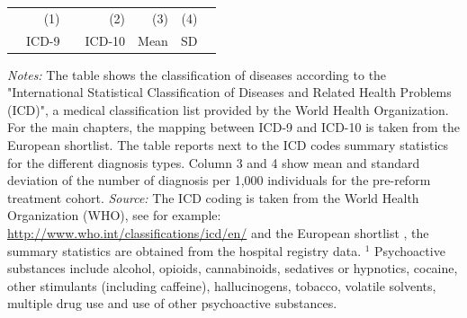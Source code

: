 \documentclass[11pt, a4paper]{article} %
\begin{document}
\begin{landscape}
\begin{table}[h]
\begin{threeparttable}
			\begin{tabular}{lrrrrrr} %
				\toprule %
				&\multicolumn{1}{r}{(1)}& &\multicolumn{1}{r}{(2)}&\multicolumn{1}{r}{(3)} &\multicolumn{1}{r}{(4)}\\
				&\multicolumn{1}{r}{ICD-9} & & \multicolumn{1}{r}{ICD-10}&\multicolumn{1}{r}{Mean}&\multicolumn{1}{r}{SD} \\ 
				\midrule
				
				\bottomrule %
			\end{tabular}
			\begin{tablenotes}
				\scriptsize{ \item \textit{Notes:} The table shows the classification of diseases according to the "International Statistical Classification of Diseases and Related Health Problems (ICD)", a medical classification list provided by the World Health Organization. For the main chapters, the mapping between ICD-9 and ICD-10 is taken from the European shortlist. The table reports next to the ICD codes summary statistics for the different diagnosis types. Column 3 and 4 show mean and standard deviation of the number of diagnosis per 1,000 individuals for the pre-reform treatment cohort. \newline \textit{Source:} The ICD coding is taken from the World Health Organization (WHO), see for example: \href{http://www.who.int/classifications/icd/en/}{http://www.who.int/classifications/icd/en/} and the European shortlist \citep[p. 76]{statistisches2012diagnosedaten}, the summary statistics are obtained from the hospital registry data. \newline\hspace*{15 pt}$^1$ Psychoactive substances include alcohol, opioids, cannabinoids, sedatives or hypnotics, cocaine, other stimulants (including caffeine), hallucinogens, tobacco, volatile solvents, multiple drug use and use of other psychoactive substances. }
			\end{tablenotes}
		\end{threeparttable}
	\end{table}
	\vspace*{\fill}\clearpage 
\end{landscape}
\restoregeometry
\end{document}
